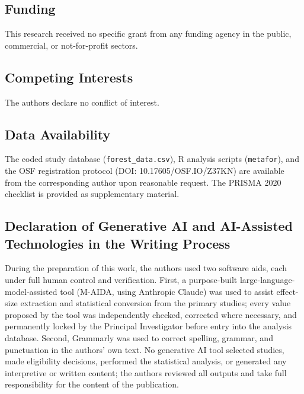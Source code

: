 \documentclass[
  12pt,a4paper]{article}
\begin{document}
\hypertarget{funding}{%
\subsection{Funding}\label{funding}}

This research received no specific grant from any funding agency in the
public, commercial, or not-for-profit sectors.

\hypertarget{competing-interests}{%
\subsection{Competing Interests}\label{competing-interests}}

The authors declare no conflict of interest.

\hypertarget{data-availability}{%
\subsection{Data Availability}\label{data-availability}}

The coded study database (\texttt{forest\_data.csv}), R analysis scripts
(\texttt{metafor}), and the OSF registration protocol (DOI:
10.17605/OSF.IO/Z37KN) are available from
the corresponding author upon reasonable request. The PRISMA 2020
checklist is provided as supplementary material.

\hypertarget{declaration-of-generative-ai-and-ai-assisted-technologies-in-the-writing-process}{%
\subsection{Declaration of Generative AI and AI-Assisted Technologies in
the Writing
Process}\label{declaration-of-generative-ai-and-ai-assisted-technologies-in-the-writing-process}}

During the preparation of this work, the authors used two software aids,
each under full human control and verification. First, a purpose-built
large-language-model-assisted tool (M-AIDA, using Anthropic Claude) was
used to assist effect-size extraction and statistical conversion from
the primary studies; every value proposed by the tool was independently
checked, corrected where necessary, and permanently locked by the
Principal Investigator before entry into the analysis database. Second,
Grammarly was used to correct spelling, grammar, and punctuation in the
authors' own text. No generative AI tool selected studies, made
eligibility decisions, performed the statistical analysis, or generated
any interpretive or written content; the authors reviewed all outputs
and take full responsibility for the content of the publication.
\end{document}
